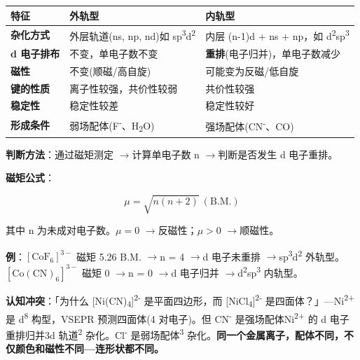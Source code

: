 \documentclass[a4paper,11pt]{ctexart}
\newcounter{none}
\newcommand{\箭}{\ensuremath{\rightarrow}}
\newcommand{\左箭}{\ensuremath{\leftarrow}}
\newcommand{\上箭}{\ensuremath{\uparrow}}
\newcommand{\下箭}{\ensuremath{\downarrow}}
\newcommand{\衡}{\ensuremath{\rightleftharpoons}}
\newcommand{\双箭}{\ensuremath{\leftrightarrow}}
\newcommand{\约等于}{\ensuremath{\approx}}
\newcommand{\小于等于}{\ensuremath{\leq}}
\newcommand{\大于等于}{\ensuremath{\geq}}
\newcommand{\不等于}{\ensuremath{\neq}}
\newcommand{\西格马}{\ensuremath{\sigma}}
\newcommand{\派}{\ensuremath{\pi}}
\begin{document}
{\def\LTcaptype{none} %
\begin{longtable}[]{@{}
  >{\raggedright\arraybackslash}p{}
  >{\raggedright\arraybackslash}p{}
  >{\raggedright\arraybackslash}p{}@{}}
\toprule\noalign{}
\begin{minipage}[b]{\linewidth}\raggedright
特征
\end{minipage} & \begin{minipage}[b]{\linewidth}\raggedright
外轨型
\end{minipage} & \begin{minipage}[b]{\linewidth}\raggedright
内轨型
\end{minipage} \\
\midrule\noalign{}
\endhead
\bottomrule\noalign{}
\endlastfoot
\textbf{杂化方式} & 外层轨道(ns, np, nd)如 sp\textsuperscript{3}d\textsuperscript{2} & 内层 (n-1)d + ns + np，如 d\textsuperscript{2}sp\textsuperscript{3} \\
\textbf{d 电子排布} & 不变，单电子数不变 & \textbf{重排}(电子归并)，单电子数减少 \\
\textbf{磁性} & 不变(顺磁/高自旋) & 可能变为反磁/低自旋 \\
\textbf{键的性质} & 离子性较强，共价性较弱 & 共价性较强 \\
\textbf{稳定性} & 稳定性较差 & 稳定性较好 \\
\textbf{形成条件} & 弱场配体(F\textsuperscript{-}、H\textsubscript{2}O) & 强场配体(CN\textsuperscript{-}、CO) \\
\end{longtable}
}

\textbf{判断方法}：通过磁矩测定 \箭 计算单电子数 n \箭 判断是否发生 d 电子重排。

\textbf{磁矩公式}：

\[
\mu = \sqrt{n(n+2)}\ (\text{B.M.})
\]

其中 n 为未成对电子数。\(\mu = 0\) \箭 反磁性；\(\mu > 0\) \箭 顺磁性。

\textbf{例}：\([\mathrm{CoF_6}]^{3-}\) 磁矩 5.26 B.M. \箭 n = 4 \箭 d 电子未重排 \箭 sp\textsuperscript{3}d\textsuperscript{2} 外轨型。
\([\mathrm{Co(CN)_6}]^{3-}\) 磁矩 0 \箭 n = 0 \箭 d 电子归并 \箭 d\textsuperscript{2}sp\textsuperscript{3} 内轨型。

\textbf{认知冲突}：「为什么 {[}Ni(CN)\textsubscript{4}{]}\textsuperscript{2-} 是平面四边形，而 {[}NiCl\textsubscript{4}{]}\textsuperscript{2-} 是四面体？」---Ni\textsuperscript{2+} 是 d\textsuperscript{8} 构型，VSEPR 预测四面体(4 对电子)。但 CN\textsuperscript{-} 是强场配体 Ni\textsuperscript{2+} 的 d 电子重排归并 3d 轨道\textsuperscript{2} 杂化。Cl\textsuperscript{-} 是弱场配体\textsuperscript{3} 杂化。\textbf{同一个金属离子，配体不同，不仅颜色和磁性不同---连形状都不同。}
\end{document}
